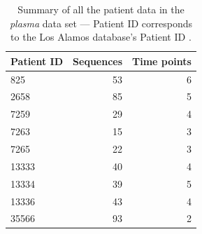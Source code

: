 \documentclass[12pt]{article}
\begin{document}
\begin{table}[!ht]
\def\arraystretch{1.3}%
\begin{center}
\begin{tabular}{lrr} 
Patient ID & Sequences & Time points \\
\hline
825 & 53 & 6 \\
2658 & 85 & 5 \\
7259 & 29 & 4 \\
7263 & 15 & 3 \\
7265 & 22 & 3 \\
13333 & 40 & 4 \\
13334 & 39 & 5 \\
13336 & 43 & 4 \\
35566 & 93 & 2 \\
\hline
\end{tabular}
\end{center}
  \caption{Summary of all the patient data in the \emph{plasma} data set --- Patient ID corresponds to the Los Alamos database's Patient ID \citep{LosAlamos}.
   }\label{tab:patientsplasma} 
\end{table}
\end{document}
